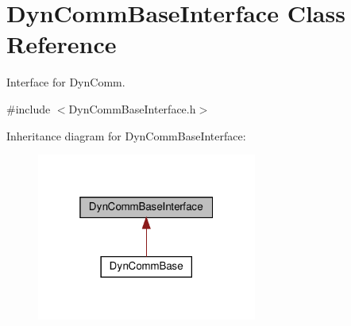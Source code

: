 \hypertarget{classDynCommBaseInterface}{}\section{Dyn\+Comm\+Base\+Interface Class Reference}
\label{classDynCommBaseInterface}


Interface for Dyn\+Comm.  




{\ttfamily \#include $<$Dyn\+Comm\+Base\+Interface.\+h$>$}



Inheritance diagram for Dyn\+Comm\+Base\+Interface\+:
\nopagebreak
\begin{figure}[H]
\begin{center}
\leavevmode
\includegraphics[width=205pt]{classDynCommBaseInterface__inherit__graph}
\end{center}
\end{figure}
